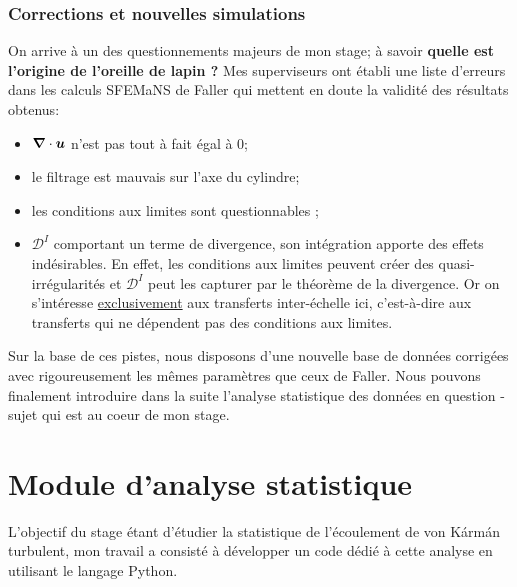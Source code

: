 \documentclass[13pt, a4paper]{extarticle}
\begin{document}
\subsubsection{Corrections et nouvelles simulations}\label{sec:problematique}
\noindent On arrive à un des questionnements majeurs de mon stage; à savoir 
{\bf quelle est l'origine de l'oreille de lapin ?} Mes superviseurs ont établi
une liste d'erreurs dans les calculs SFEMaNS de Faller qui mettent en doute 
la validité des résultats obtenus:
\begin{itemize}
  \item $\grad\cdot \boldsymbol{u}$ n'est pas tout à fait égal à 0;
  \item le filtrage est mauvais sur l'axe du cylindre;
  \item les conditions aux limites sont questionnables ;
  \item $\mathscr{D}^I$ comportant un terme de divergence, son intégration apporte
        des effets indésirables. En effet, les conditions aux limites peuvent créer des quasi-
        irrégularités et $\mathscr{D}^I$ peut les capturer par le théorème de la divergence.
        Or on s'intéresse \ul{exclusivement} aux transferts inter-échelle ici, 
        c'est-à-dire aux transferts qui ne dépendent pas des conditions aux limites.
\end{itemize}
Sur la base de ces pistes, nous disposons d'une nouvelle base de données corrigées
avec rigoureusement les mêmes paramètres que ceux de Faller.
Nous pouvons finalement introduire dans la suite l'analyse statistique des données
en question - sujet qui est au coeur de mon stage. 

\section{Module d'analyse statistique}
\noindent L'objectif du stage étant d'étudier la statistique de l'écoulement de von Kármán turbulent,
mon travail a consisté à développer un code dédié à cette analyse en utilisant le langage Python. 
\end{document}
